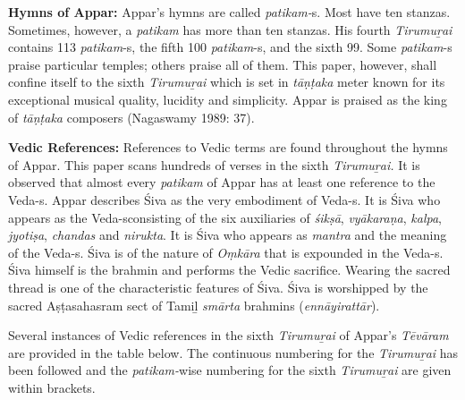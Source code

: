 \textbf{Hymns of Appar:} Appar’s hymns are called \textit{patikam-}s. Most have ten stanzas. Sometimes, however, a \textit{patikam} has more than ten stanzas. His fourth \textit{Tirumuṟai }contains 113 \textit{patikam}-s, the fifth 100 \textit{patikam}-s, and the sixth 99. Some \textit{patikam}-s praise particular temples; others praise all of them. This paper, however, shall confine itself to the sixth \textit{Tirumuṟai} which is set in \textit{tāṇṭaka} meter known for its exceptional musical quality, lucidity and simplicity. Appar is praised as the king of \textit{tāṇṭaka }composers (Nagaswamy 1989: 37).

\textbf{Vedic References:} References to Vedic terms are found throughout the hymns of Appar. This paper scans hundreds of verses in the sixth \textit{Tirumuṟai. }It is observed that almost every \textit{patikam} of Appar has at least one reference to the Veda-s. Appar describes Śiva as the very embodiment of Veda-s. It is Śiva who appears as the Veda-s\break consisting of the six auxiliaries of \textit{śikṣā}, \textit{vyākaraṇa}, \textit{kalpa}, \textit{jyotiṣa}, \textit{chandas} and \textit{nirukta}. It is Śiva who appears as \textit{mantra} and the meaning of the Veda-s. Śiva is of the nature of \textit{Oṃkāra }that is expounded in the Veda-s. Śiva himself is the brahmin and performs the Vedic sacrifice. Wearing the sacred thread is one of the characteristic features of Śiva. Śiva is worshipped by the sacred Aṣṭasahasram sect of Tamiḻ \textit{smārta} brahmins (\textit{ennāyirattār}).

Several instances of Vedic references in the sixth \textit{Tirumuṟai} of Appar’s \textit{Tēvāram} are provided in the table below. The continuous numbering for the \textit{Tirumuṟai }has been followed and the \textit{patikam-}wise numbering for the sixth \textit{Tirumuṟai }are given within brackets.

